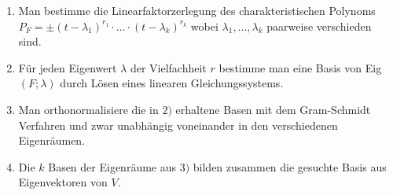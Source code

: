 \vspace{1\baselineskip}


\vspace{1\baselineskip}


\vspace{1\baselineskip}

\large {} \normalsize

\begin{enumerate}[{1)}]
    \item Man bestimme die Linearfaktorzerlegung des charakteristischen Polynoms
            $P_F = \pm (t-\lambda_1)^{r_1} \cdot \dots \cdot (t-\lambda_k)^{r_k}$
            wobei $\lambda_1,...,\lambda_k$ paarweise verschieden sind.
    \item Für jeden Eigenwert $\lambda$ der Vielfachheit $r$ bestimme man eine Basis von
            Eig$(F;\lambda)$ durch Lösen eines linearen Gleichungssystems.
    \item Man orthonormalisiere die in $2)$ erhaltene Basen mit dem Gram-Schmidt Verfahren
            und zwar unabhängig voneinander in den verschiedenen Eigenräumen.
    \item Die $k$ Basen der Eigenräume aus $3)$ bilden zusammen die gesuchte Basis aus
            Eigenvektoren von $V$.
\end{enumerate}

